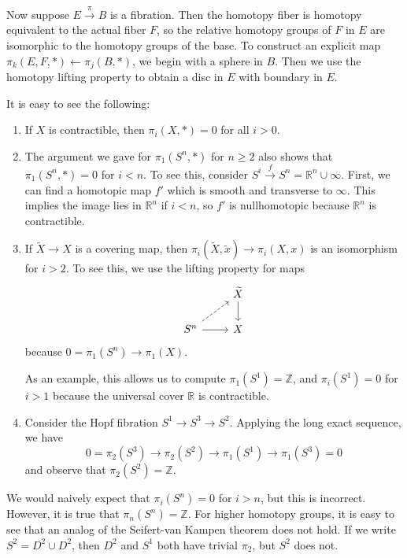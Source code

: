 \documentclass[leqno, openany]{memoir}
\theoremstyle{definition}
\theoremstyle{remark}
\theoremstyle{plain}
\theoremstyle{definition}
\theoremstyle{remark}
\newcommand{\R}{\mathbb{R}}
\newcommand{\Z}{\mathbb{Z}}
\newcommand{\wt}[1]{\widetilde{#1}}
\begin{document}
Now suppose $E \xrightarrow{\pi} B$ is a fibration. Then the homotopy fiber is homotopy equivalent to the actual fiber $F$, so the relative homotopy groups of $F$ in $E$ are isomorphic to the homotopy groups of the base. To construct an explicit map $\pi_k(E,F,*) \gets \pi_j(B,*)$, we begin with a sphere in $B$. Then we use the homotopy lifting property to obtain a disc in $E$ with boundary in $E$.

It is easy to see the following:
\begin{enumerate}
    \item If $X$ is contractible, then $\pi_i(X,*) = 0$ for all $i > 0$.
    \item The argument we gave for $\pi_1(S^n, *)$ for $n \geq 2$ also shows that $\pi_1(S^n, *) = 0$ for $i < n$. To see this, consider $S^i \xrightarrow{f} S^n = \R^n \cup \infty$. First, we can find a homotopic map $f'$ which is smooth and transverse to $\infty$. This implies the image lies in $\R^n$ if $i < n$, so $f'$ is nullhomotopic because $\R^n$ is contractible.
    \item If $\wt{X} \to X$ is a covering map, then $\pi_i(\wt{X}, \wt{x}) \to \pi_i(X,x)$ is an isomorphism for $i > 2$. To see this, we use the lifting property for maps
        \begin{equation*}
        \begin{tikzcd}
            & \wt{X} \arrow{d} \\
            S^n \arrow{r} \arrow[dashrightarrow]{ur} & X
        \end{tikzcd}
        \end{equation*}
        because $0 = \pi_1(S^n) \to \pi_1(X)$. 

        As an example, this allows us to compute $\pi_1(S^1) = \Z$, and $\pi_i(S^1) = 0$ for $i > 1$ because the universal cover $\R$ is contractible.
    \item Consider the Hopf fibration $S^1 \to S^3 \to S^2$. Applying the long exact sequence, we have
        \[ 0 = \pi_2(S^3) \to \pi_2(S^2) \to \pi_1(S^1) \to \pi_1(S^3) = 0 \]
        and observe that $\pi_2(S^2) = \Z$.
\end{enumerate}

We would naively expect that $\pi_i(S^n) = 0$ for $i > n$, but this is incorrect. However, it is true that $\pi_n(S^n) = \Z$. For higher homotopy groups, it is easy to see that an analog of the Seifert-van Kampen theorem does not hold. If we write $S^2 = D^2 \cup D^2$, then $D^2$ and $S^1$ both have trivial $\pi_2$, but $S^2$ does not.
\end{document}
